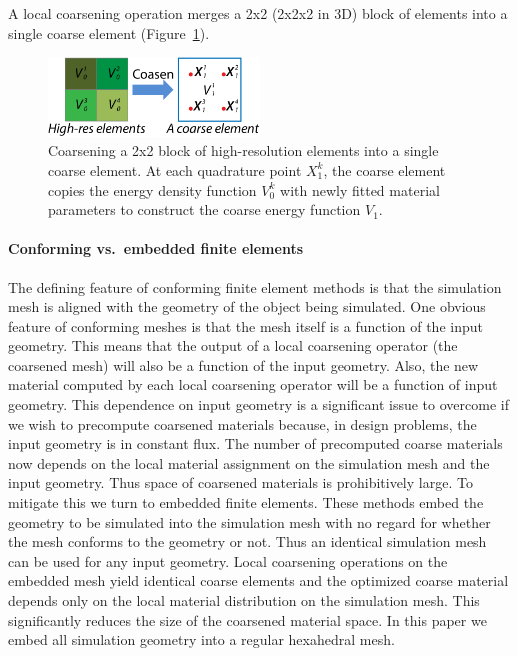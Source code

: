A local coarsening operation merges a 2x2 (2x2x2 in 3D) block of elements into a single coarse element (Figure~\ref{fig:coarsen}).
\begin{figure}
	\centering	
	\includegraphics[width=0.5\textwidth]{images/coarsen.pdf}
	\caption{Coarsening a 2x2 block of high-resolution elements into a single coarse element.
		At each quadrature point $X_1^k$, the coarse element copies the energy density function $V_0^k$ with newly fitted material parameters to construct the coarse energy function
		$V_1$.}
	\label{fig:coarsen}
\end{figure}
\paragraph{Conforming vs.~embedded finite elements}
The defining feature of conforming finite element methods is that the simulation mesh is aligned with the geometry of the object being simulated. One obvious feature of conforming meshes is that the mesh itself is a function of the input geometry. This means that the output of a local coarsening operator (the coarsened mesh) will also be a function of the input geometry. Also, the new material computed by each local coarsening operator will be a function of input geometry. This dependence on input geometry is a significant issue to overcome if we wish to precompute coarsened materials because, in design problems, the input geometry is in constant flux. The number of precomputed coarse materials now depends on the local material assignment on the simulation mesh and the input geometry. Thus space of coarsened materials is prohibitively large. 
To mitigate this we turn to embedded finite elements. These methods embed the geometry to be simulated into the simulation mesh with no regard for whether the mesh conforms to the geometry or not. Thus an identical simulation mesh can be used for any input geometry. Local coarsening operations on the embedded mesh yield identical coarse elements and the optimized coarse material depends only on the local material distribution on the simulation mesh.  This significantly reduces the size of the coarsened material space. In this paper we embed all simulation geometry into a regular hexahedral mesh.


